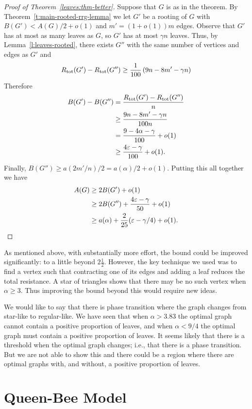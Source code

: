 \documentclass[11pt]{article}
\theoremstyle{remark}
\def\a{\alpha}
\newcommand\rtot{R_{{\rm tot}}}
\def\eps{\varepsilon}
\begin{document}
\begin{proof}[Proof of Theorem~\ref{leaves:thm-better}]
  Suppose that $G$ is as in the theorem. By
  Theorem~\ref{t:main-rooted-rrg-lemma} we let $G'$ be a rooting of
  $G$ with $B(G')<A(G)/2+o(1)$ and $m'=(1+o(1))m$ edges. Observe
  that $G'$ has at most as many leaves as $G$, so $G'$ has at most
  $\gamma n$ leaves. Thus, by Lemma~\ref{l:leaves-rooted}, there
  exists $G''$ with the same number of vertices and edges as $G'$ and
\[    \rtot(G')-\rtot(G'')\ge \frac1{100}\left(9n-8m'-\gamma n\right)\]
  Therefore
  \begin{align*}
    B(G')-B(G'')&= \frac{\rtot(G')-\rtot(G'')}{n}\\
    &\ge \frac{9n-8m'-\gamma n}{100n}\\
    &=    \frac{9-4\a-\gamma }{100}+o(1)\\
    &\ge    \frac{4\eps-\gamma }{100}+o(1).
  \end{align*}
  Finally, $B(G'')\ge a(2m'/n)/2=a(\alpha)/2+o(1)$. Putting this all together we have
  \begin{align*}
    A(G)&\ge 2B(G')+o(1)\\
    &\ge 2B(G'')+\frac{4\eps-\gamma }{50}+o(1)\\
    &\ge a(\alpha)+\frac{2}{25}(\eps-\gamma/4)+o(1).\qedhere
  \end{align*}
\end{proof}

As mentioned above, with substantially more effort, the bound could be
improved significantly: to a little beyond $2\frac12$. However, the
key technique we used was to find a vertex such that contracting one
of its edges and adding a leaf reduces the total resistance.  A star
of triangles shows that there may be no such vertex when $\a\ge
3$. Thus improving the bound beyond this would require new ideas.




We would like to say that there is phase transition where the graph
changes from star-like to regular-like. We have seen that when
$\a>3.83$ the optimal graph cannot contain a positive proportion of
leaves, and when $\a<9/4$ the optimal graph must contain a positive
proportion of leaves. It seems likely that there is a threshold when
the optimal graph changes; i.e., that there is a phase transition. But
we are not able to show this and there could be a region where there
are optimal graphs with, and without, a positive proportion of leaves.

\section{Queen-Bee Model}\label{s:queen-bee}
\end{document}
